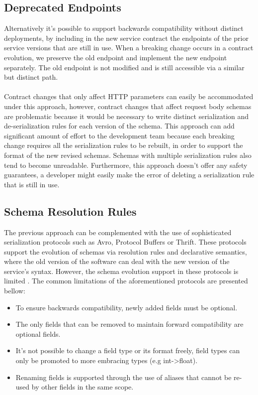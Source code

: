 \subsection{Deprecated Endpoints} %
\label{sec:deprecated_endpoints}

Alternatively it's possible to support backwards compatibility without distinct deployments,
by including in the new service contract the endpoints of the prior service versions that are still in use.
When a breaking change occurs in a contract evolution, we preserve the old endpoint and implement the new endpoint separately.
The old endpoint is not modified and is still accessible via a similar but distinct path.

\paragraph{}

Contract changes that only affect HTTP parameters can easily be accommodated under this approach, however, contract changes that affect
request body schemas are problematic because it would be necessary to write distinct serialization and de-serialization rules for each version of the schema.
This approach can add significant amount of effort to the development team because each breaking change requires all the serialization rules to be rebuilt,
in order to support the format of the new revised schemas.
Schemas with multiple serialization rules also tend to become unreadable.
Furthermore, this approach doesn't offer any safety guarantees,
a developer might easily make the error of deleting a serialization rule that is still in use.

\subsection{Schema Resolution Rules} %
\label{sec:schema_resolution_rules}

The previous approach can be complemented with the use of sophisticated serialization protocols such as Avro, Protocol Buffers or Thrift.
These protocols support the evolution of schemas via resolution rules and declarative semantics,
where the old version of the software can deal with the new version of the service’s syntax.
However, the schema evolution support in these protocols is limited \cite{11}.
The common limitations of the aforementioned protocols are presented bellow:

\begin{itemize}
    \item To ensure backwards compatibility, newly added fields must be optional.
    \item The only fields that can be removed to maintain forward compatibility are optional fields.
    \item It's not possible to change a field type or its format freely, field types can only be promoted to more embracing types (e.g int->float).
    \item Renaming fields is supported through the use of aliases that cannot be re-used by other fields in the same scope.
\end{itemize}


